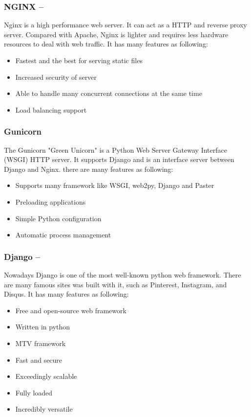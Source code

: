 \subsubsection*{NGINX  --  }
Nginx is a high performance web server. It can act as a HTTP and reverse proxy server. 
Compared with Apache, Nginx is lighter and requires less hardware resources 
to deal with web traffic. It has many features as following:
\begin{itemize}
	\item Fastest and the best for serving static files
	\item Increased security of server
	\item Able to handle many concurrent connections at the same time
	\item Load balancing support
\end{itemize}

\subsubsection*{Gunicorn}
The Gunicorn "Green Unicorn" is a Python Web Server Gateway Interface (WSGI) HTTP server. 
It supports Django and is an interface server between Django and Nginx.
there are many features as following:
\begin{itemize}
	\item Supports many framework like WSGI, web2py, Django and Paster
	\item Preloading applications
	\item Simple Python configuration
	\item Automatic process management
\end{itemize}

\subsubsection*{Django  --  }
Nowadays Django is one of the most well-known python web framework. 
There are many famous sites was built with it, such as Pinterest, Instagram, and Disqus. 
It has many features as following:
\begin{itemize}
	\item Free and open-source web framework
	\item Written in python
	\item MTV framework
	\item Fast and secure
	\item Exceedingly scalable
	\item Fully loaded
	\item Incredibly versatile
\end{itemize}

